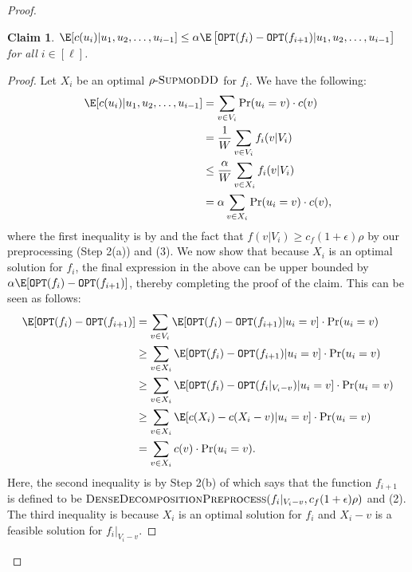 \documentclass{article}
\newtheorem{claim}{Claim}[section]
\newcommand{\OPT}{\ensuremath{\mathtt{OPT}}\xspace}
\newcommand{\sdds}{\ensuremath{\textsc{SupmodDD}}\xspace}
\newcommand{\rhosdds}[1]{\ensuremath{#1\text{-}\sdds}}
\begin{document}
\begin{proof}
    \begin{claim}\label{claim:supermartingale-helper} 
    $\E[c(u_i)|u_1, u_2, \ldots, u_{i-1}] \leq \alpha\E\left[\OPT(f_i) - \OPT(f_{i+1}) |u_1, u_2, \ldots, u_{i-1}\right]$ for all $i \in [\ell]$.
\end{claim}
\begin{proof}
Let $X_i$ be an optimal \rhosdds{\rho} for $f_i$. 
We have the following:
\begin{align*}
    \E[c(u_i) | u_1, u_2, \ldots, u_{i-1}] 
    &= \sum_{v \in V_i} \Pr(u_i = v)\cdot c(v) \\
    &= \frac{1}{W}\sum_{v \in V_i}f_i(v|V_i)\\
    &\leq \frac{\alpha}{W}\sum_{v \in X_i} f_i(v|V_i)\\
    &= \alpha\sum_{v \in X_i} \Pr(u_i = v)\cdot c(v),
 \end{align*}
 where the first inequality is by  and the fact that $f(v|V_i) \geq c_f(1+\epsilon)\rho$ by our preprocessing (Step 2(a)) and (3). 
 We now show that because $X_i$ is an optimal solution for $f_i$, the final expression in the above can be upper bounded by $\alpha\E[\OPT(f_i) - \OPT(f_{i+1})]$, thereby completing the proof of the claim. 
 This can be seen as follows:
\begin{align*}
    \E[\OPT(f_i) - \OPT(f_{i+1})] & = \sum_{v \in V_i}\E[\OPT(f_i) - \OPT(f_{i+1}) | u_i = v]\cdot \Pr(u_i = v)\\
    & \geq \sum_{v \in X_i} \E[\OPT(f_i) - \OPT(f_{i+1}) | u_i = v]\cdot \Pr(u_i = v)\\
    &\geq \sum_{v \in X_i} \E[\OPT(f_i) - \OPT(f_{i}|_{V_i - v}) | u_i = v]\cdot \Pr(u_i = v)\\
    & \geq  \sum_{v \in X_i} \E[c(X_i) - c(X_i - v) | u_i = v]\cdot \Pr(u_i = v)\\
    & = \sum_{v \in X_i}c(v)\cdot \Pr(u_i = v).
\end{align*}
Here, the second inequality is by Step 2(b) of  which says that the function $f_{i+1}$ is defined to be $ \textsc{DenseDecompositionPreprocess}(f_i|_{V_i - v}, c_f(1+\epsilon)\rho)$ and (2). The third inequality is because $X_i$ is an optimal solution for $f_i$ and $X_i - v$ is a feasible solution for $f_i|_{V_i - v}$.
\end{proof}
    

\end{proof}
\end{document}
